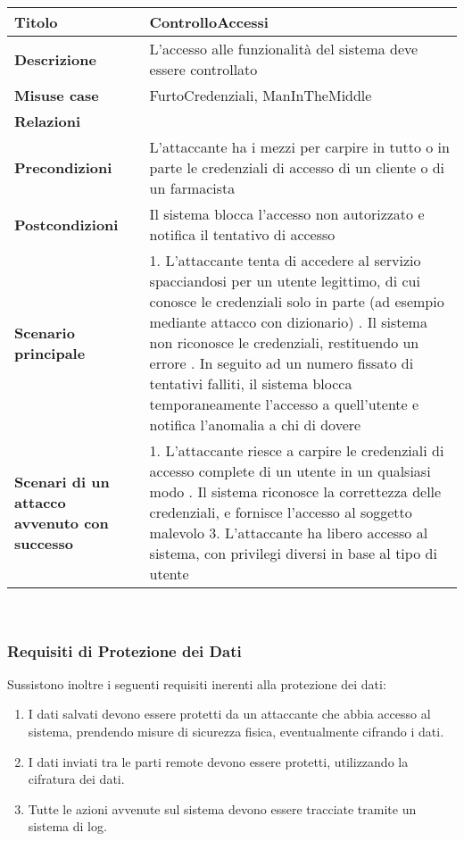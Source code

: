 \begin{tabular} {|P{4cm}|P{13cm}|}
\hline
  \textbf{Titolo} & ControlloAccessi\\
\hline
  \textbf{Descrizione} & L'accesso alle funzionalità del sistema deve essere controllato\\
\hline
  \textbf{Misuse case} & FurtoCredenziali, ManInTheMiddle\\
\hline
  \textbf{Relazioni} &\\
\hline
  \textbf{Precondizioni} & L'attaccante ha i mezzi per carpire in tutto o in parte le credenziali di accesso di un cliente o di un farmacista\\
\hline
  \textbf{Postcondizioni} & Il sistema blocca l'accesso non autorizzato e notifica il tentativo di accesso\\
\hline
  \textbf{Scenario principale} & 1. L'attaccante tenta di accedere al servizio spacciandosi per un utente legittimo, di cui conosce le credenziali solo in parte (ad esempio mediante attacco con dizionario) . Il sistema non riconosce le credenziali, restituendo un errore . In seguito ad un numero fissato di tentativi falliti, il sistema blocca temporaneamente l'accesso a quell'utente e notifica l'anomalia a chi di dovere\\
\hline
  \textbf{Scenari di un attacco avvenuto con successo} & 1. L'attaccante riesce a carpire le credenziali di accesso complete di un utente in un qualsiasi modo . Il sistema riconosce la correttezza delle credenziali, e fornisce l'accesso al soggetto malevolo 3. L'attaccante ha libero accesso al sistema, con privilegi diversi in base al tipo di utente\\
\hline
\end{tabular}
\\

\subsubsection{Requisiti di Protezione dei Dati}

Sussistono inoltre i seguenti requisiti inerenti alla protezione dei dati: 
\begin{enumerate}
 \item I dati salvati devono essere protetti da un attaccante che abbia accesso al sistema, prendendo misure
di sicurezza fisica, eventualmente cifrando i dati. 
 \item I dati inviati tra le parti remote devono essere protetti, utilizzando la cifratura dei
dati. 
 \item Tutte le azioni avvenute sul sistema devono essere tracciate
tramite un sistema di log. 
\end{enumerate}

